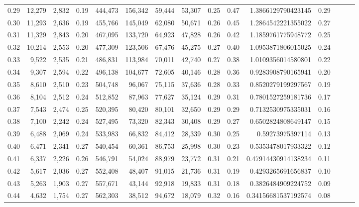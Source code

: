 \begin{tabular}{rrrrrrrrrrrrrrr}
0.29 &  12,279 &  2,832 &  0.19 &  444,473 &  156,342 &   59,444 &   53,307 &  0.25 &  0.47 &      1.3866129790423145 &      0.29 \\
0.30 &  11,293 &  2,636 &  0.19 &  455,766 &  145,049 &   62,080 &   50,671 &  0.26 &  0.45 &      1.2864542221355022 &      0.27 \\
0.31 &  11,329 &  2,843 &  0.20 &  467,095 &  133,720 &   64,923 &   47,828 &  0.26 &  0.42 &      1.1859761775948772 &      0.25 \\
0.32 &  10,214 &  2,553 &  0.20 &  477,309 &  123,506 &   67,476 &   45,275 &  0.27 &  0.40 &      1.0953871806015025 &      0.24 \\
0.33 &   9,522 &  2,535 &  0.21 &  486,831 &  113,984 &   70,011 &   42,740 &  0.27 &  0.38 &      1.0109356014580801 &      0.22 \\
0.34 &   9,307 &  2,594 &  0.22 &  496,138 &  104,677 &   72,605 &   40,146 &  0.28 &  0.36 &      0.9283908790165941 &      0.20 \\
0.35 &   8,610 &  2,510 &  0.23 &  504,748 &   96,067 &   75,115 &   37,636 &  0.28 &  0.33 &      0.8520279199297567 &      0.19 \\
0.36 &   8,104 &  2,512 &  0.24 &  512,852 &   87,963 &   77,627 &   35,124 &  0.29 &  0.31 &      0.7801527259181736 &      0.17 \\
0.37 &   7,543 &  2,474 &  0.25 &  520,395 &   80,420 &   80,101 &   32,650 &  0.29 &  0.29 &      0.7132530975335031 &      0.16 \\
0.38 &   7,100 &  2,242 &  0.24 &  527,495 &   73,320 &   82,343 &   30,408 &  0.29 &  0.27 &      0.6502824808649147 &      0.15 \\
0.39 &   6,488 &  2,069 &  0.24 &  533,983 &   66,832 &   84,412 &   28,339 &  0.30 &  0.25 &        0.59273975397114 &      0.13 \\
0.40 &   6,471 &  2,341 &  0.27 &  540,454 &   60,361 &   86,753 &   25,998 &  0.30 &  0.23 &      0.5353478017933322 &      0.12 \\
0.41 &   6,337 &  2,226 &  0.26 &  546,791 &   54,024 &   88,979 &   23,772 &  0.31 &  0.21 &     0.47914430914138234 &      0.11 \\
0.42 &   5,617 &  2,036 &  0.27 &  552,408 &   48,407 &   91,015 &   21,736 &  0.31 &  0.19 &      0.4293265691656837 &      0.10 \\
0.43 &   5,263 &  1,903 &  0.27 &  557,671 &   43,144 &   92,918 &   19,833 &  0.31 &  0.18 &      0.3826484909224752 &      0.09 \\
0.44 &   4,632 &  1,754 &  0.27 &  562,303 &   38,512 &   94,672 &   18,079 &  0.32 &  0.16 &     0.34156681537192574 &      0.08 \\

\end{tabular}
